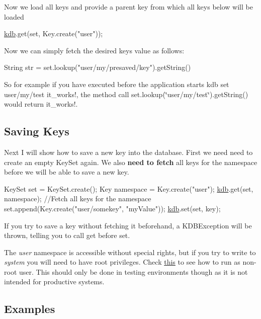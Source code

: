 Now we load all keys and provide a parent key from which all keys below will be loaded 
\begin{DoxyCode}
\hyperlink{namespacekdb}{kdb}.get(\textcolor{keyword}{set}, Key.create(\textcolor{stringliteral}{"user"}));
\end{DoxyCode}
 Now we can simply fetch the desired key\textquotesingle{}s value as follows\+: 
\begin{DoxyCode}
String str = \textcolor{keyword}{set}.lookup(\textcolor{stringliteral}{"user/my/presaved/key"}).getString()
\end{DoxyCode}
 So for example if you have executed before the application starts {\ttfamily kdb set user/my/test it\+\_\+works!}, the method call {\ttfamily set.\+lookup(\char`\"{}user/my/test\char`\"{}).get\+String()} would return {\ttfamily it\+\_\+works!}.

\subsection*{Saving Keys}

Next I will show how to save a new key into the database. First we need need to create an empty {\ttfamily Key\+Set} again. We also {\bfseries need to fetch} all keys for the namespace before we will be able to save a new key.


\begin{DoxyCode}
KeySet \textcolor{keyword}{set} = KeySet.create();
Key \textcolor{keyword}{namespace }= Key.create("user");
\hyperlink{namespacekdb}{kdb}.get(\textcolor{keyword}{set}, \textcolor{keyword}{namespace});    \textcolor{comment}{//Fetch all keys for the namespace}
\textcolor{keyword}{set}.append(Key.create(\textcolor{stringliteral}{"user/somekey"}, \textcolor{stringliteral}{"myValue"}));
\hyperlink{namespacekdb}{kdb}.set(\textcolor{keyword}{set}, key);
\end{DoxyCode}


If you try to save a key without fetching it beforehand, a {\ttfamily K\+D\+B\+Exception} will be thrown, telling you to call get before set.

The {\itshape user} namespace is accessible without special rights, but if you try to write to {\itshape system} you will need to have root privileges. Check \hyperlink{doc_TESTING_md}{this} to see how to run as non-\/root user. This should only be done in testing environments though as it is not intended for productive systems.

\subsection*{Examples}

